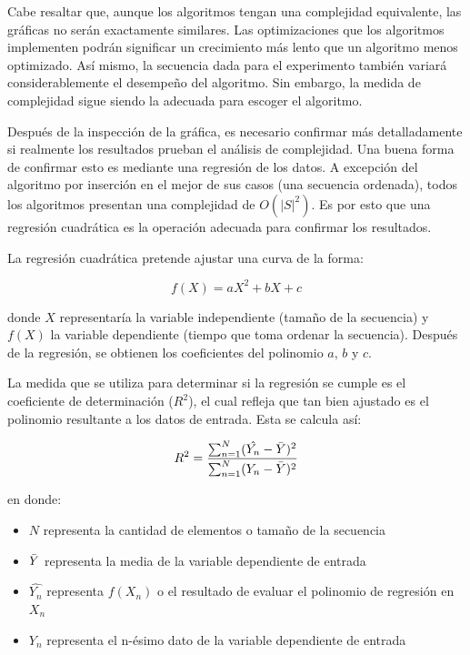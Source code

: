 \documentclass[letter]{article}
\begin{document}
Cabe resaltar que, aunque los algoritmos tengan una complejidad equivalente, las gráficas no serán exactamente similares. Las optimizaciones que los algoritmos implementen podrán significar un crecimiento más lento que un algoritmo menos optimizado. Así mismo, la secuencia dada para el experimento también variará considerablemente el desempeño del algoritmo. Sin embargo, la medida de complejidad sigue siendo la adecuada para escoger el algoritmo. \par

Después de la inspección de la gráfica, es necesario confirmar más detalladamente si realmente los resultados prueban el análisis de complejidad. Una buena forma de confirmar esto es mediante una regresión de los datos. A excepción del algoritmo por inserción en el mejor de sus casos (una secuencia ordenada), todos los algoritmos presentan una complejidad de $O(|S|^2)$. Es por esto que una regresión cuadrática es la operación adecuada para confirmar los resultados. \par

La regresión cuadrática pretende ajustar una curva de la forma:

\[f(X) = aX^{2} + bX + c\]

donde $X$ representaría la variable independiente (tamaño de la secuencia) y $f(X)$ la variable dependiente (tiempo que toma ordenar la secuencia). Después de la regresión, se obtienen los coeficientes del polinomio $a$, $b$ y $c$. \par

La medida que se utiliza para determinar si la regresión se cumple es el coeficiente de determinación ($R^{2}$), el cual refleja que tan bien ajustado es el polinomio resultante a los datos de entrada. Esta se calcula así:

\[R^{2} = \frac{\sum_{n=1}^{N} (\hat{Y_n} - \Bar{Y})^2}{\sum_{n=1}^{N} (Y_n - \Bar{Y})^2} \]

en donde:

\begin{itemize}
    \item $N$ representa la cantidad de elementos o tamaño de la secuencia
    \item $\Bar{Y}$ representa la media de la variable dependiente de entrada
    \item $\hat{Y_n}$ representa $f(X_n)$ o el resultado de evaluar el polinomio de regresión en $X_n$
    \item $Y_n$ representa el n-ésimo dato de la variable dependiente de entrada
\end{itemize}
\end{document}
